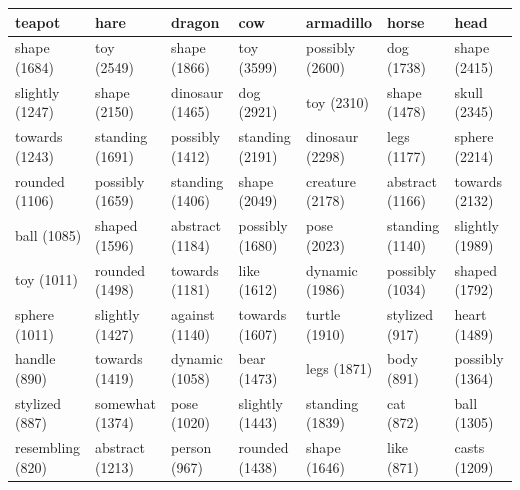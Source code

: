 \begin{tabular}{lllllll}
\toprule
teapot & hare & dragon & cow & armadillo & horse & head \\
\midrule
shape (1684) & toy (2549) & shape (1866) & toy (3599) & possibly (2600) & dog (1738) & shape (2415) \\
slightly (1247) & shape (2150) & dinosaur (1465) & dog (2921) & toy (2310) & shape (1478) & skull (2345) \\
towards (1243) & standing (1691) & possibly (1412) & standing (2191) & dinosaur (2298) & legs (1177) & sphere (2214) \\
rounded (1106) & possibly (1659) & standing (1406) & shape (2049) & creature (2178) & abstract (1166) & towards (2132) \\
ball (1085) & shaped (1596) & abstract (1184) & possibly (1680) & pose (2023) & standing (1140) & slightly (1989) \\
toy (1011) & rounded (1498) & towards (1181) & like (1612) & dynamic (1986) & possibly (1034) & shaped (1792) \\
sphere (1011) & slightly (1427) & against (1140) & towards (1607) & turtle (1910) & stylized (917) & heart (1489) \\
handle (890) & towards (1419) & dynamic (1058) & bear (1473) & legs (1871) & body (891) & possibly (1364) \\
stylized (887) & somewhat (1374) & pose (1020) & slightly (1443) & standing (1839) & cat (872) & ball (1305) \\
resembling (820) & abstract (1213) & person (967) & rounded (1438) & shape (1646) & like (871) & casts (1209) \\
\bottomrule
\end{tabular}
